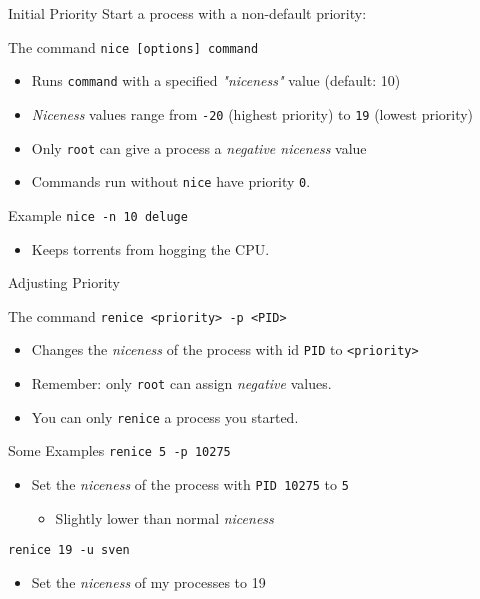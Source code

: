 \begin{frame}[fragile]{Initial Priority}
  Start a process with a non-default priority:
  \begin{block}{The  command}
    \texttt{nice [options] command}
    \begin{itemize}
      \item Runs \texttt{command} with a specified \emph{"niceness"} value (default: 10)
      \item \emph{Niceness} values range from \texttt{-20} (highest priority) to \texttt{19} (lowest priority)
      \item Only \texttt{root} can give a process a \emph{negative niceness} value
      \item Commands run without \texttt{nice} have priority \texttt{0}.
    \end{itemize}
  \end{block}
  \begin{block}{Example}
    \texttt{nice -n 10 deluge}
    \begin{itemize}
      \item Keeps torrents from hogging the CPU.
    \end{itemize}
  \end{block}
\end{frame}

\begin{frame}[fragile]{Adjusting Priority}
  \begin{block}{The  command}
    \texttt{renice <priority> -p <PID>}
    \begin{itemize}
      \item Changes the \emph{niceness} of the process with id \texttt{PID} to \texttt{<priority>}
      \item Remember: only \texttt{root} can assign \emph{negative} values.
      \item You can only \texttt{renice} a process you started.
    \end{itemize}
  \end{block}
  \begin{block}{Some Examples}
    \texttt{renice 5 -p 10275}
    \begin{itemize}
      \item Set the \emph{niceness} of the process with \texttt{PID 10275} to \texttt{5}
      \begin{itemize}
        \item Slightly lower than normal \emph{niceness}
      \end{itemize}
    \end{itemize}
    \texttt{renice 19 -u sven}
    \begin{itemize}
      \item Set the \emph{niceness} of  my processes to 19
    \end{itemize}
  \end{block}
\end{frame}

